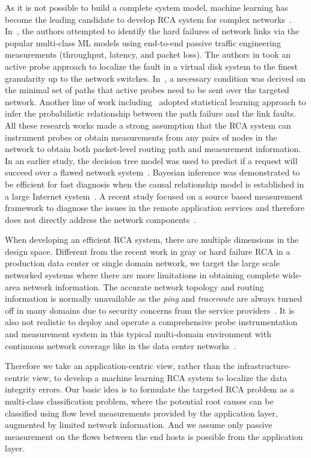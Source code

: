 As it is not possible to build a complete system model, machine learning has become the leading candidate to develop RCA system for complex networks~\cite{Boutaba:2018aa}.  
In~\cite{Link-JIoT-2019}, the authors attempted to identify the hard failures of network links via the popular multi-class ML models using end-to-end 
passive traffic engineering measurements (throughput, latency, and packet loss). The authors in \cite{DeepView:NSDI18} took an active probe approach to localize the fault in a 
virtual disk system to the finest granularity up to the network switches. In~\cite{netbouncer:nsdi18}, a necessary condition was derived on the minimal set of paths 
that active probes need to be sent over the targeted network. Another line of work including~\cite{kdd14,detector:atc17,arzani2018democratically} adopted statistical 
learning approach to infer the probabilistic relationship between the path failure and the link faults. All these research works made a strong assumption that the RCA system 
can instrument probes or obtain measurements from any pairs of nodes in the network to obtain both packet-level routing path and measurement information. In an earlier study, 
the decision tree model was used to predict if a request will succeed over a flawed network system~\cite{DT:2004}. Bayesian inference was demonstrated to be efficient for fast 
diagnosis when the causal relationship model is established in a large Internet system~\cite{BN-Internet:2007}. A recent study focused on a source based measurement framework 
to diagnose the issues in the remote application services and therefore does not directly address the network components~\cite{microrca:noms2020}.

When developing an efficient RCA system, there are multiple dimensions in the design space. Different from the recent work in 
gray or hard failure RCA  in a production data center or single domain network, we target the large scale networked systems 
where there are more limitations in obtaining complete wide-area network information. The accurate network topology and 
routing information is normally unavailable as the {\it ping} and {\it traceroute} are always turned off in many domains due to security concerns 
from the service providers~\cite{topology_obf_20}. It is also not realistic to deploy and operate a comprehensive probe instrumentation 
and measurement system in this typical multi-domain environment with continuous network coverage like in the data center networks~\cite{guo2015pingmesh}. 

Therefore we take an application-centric view, rather than the infrastructure-centric view, to develop 
a machine learning RCA system to localize the data integrity errors. Our basic idea is to formulate the targeted RCA problem as a multi-class classification problem, 
where the potential root causes can be classified using flow level measurements provided by the application layer, augmented by limited network information.
And we assume only passive measurement on the flows between the end hosts is possible from the application layer. 

